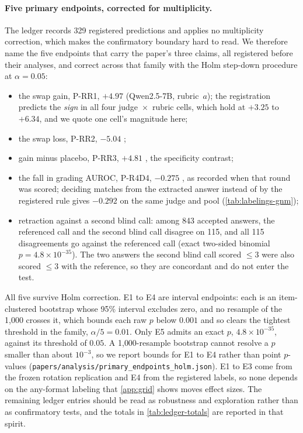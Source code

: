 \paragraph{Five primary endpoints, corrected for multiplicity.}
The ledger records 329 registered predictions and applies no multiplicity correction, which makes
the confirmatory boundary hard to read. We therefore name the five endpoints that carry the paper's
three claims, all registered before their analyses, and correct across that family with the
Holm step-down procedure at $\alpha = 0.05$:
\begin{itemize}[leftmargin=1.5em,itemsep=1pt,topsep=2pt]
\item[\textbf{E1}] the swap gain, P-RR1, $+4.97$  (Qwen2.5-7B, rubric~$a$); the
registration predicts the \emph{sign} in all four judge~$\times$~rubric cells, which hold at $+3.25$ to
$+6.34$, and we quote one cell's magnitude here;
\item[\textbf{E2}] the swap loss, P-RR2, $-5.04$ ;
\item[\textbf{E3}] gain minus placebo, P-RR3, $+4.81$ , the specificity contrast;
\item[\textbf{E4}] the fall in grading AUROC, P-R4D4, $-0.275$ , as recorded
when that round was scored; deciding matches from the extracted answer instead of by the registered
rule gives $-0.292$  on the same judge and pool (\cref{tab:labelings-gnm});
\item[\textbf{E5}] retraction against a second blind call: among 843 accepted answers, the referenced
call and the second blind call disagree on 115, and all 115 disagreements go against the referenced
call (exact two-sided binomial $p = 4.8\times10^{-35}$). The two answers the second blind call scored
$\le 3$ were also scored $\le 3$ with the reference, so they are concordant and do not enter the test.
\end{itemize}
All five survive Holm correction. E1 to E4 are interval endpoints: each is an item-clustered
bootstrap whose 95\% interval excludes zero, and no resample of the 1{,}000 crosses it, which bounds
each raw $p$ below $0.001$ and so clears the tightest threshold in the family, $\alpha/5 = 0.01$.
Only E5 admits an exact $p$, $4.8\times10^{-35}$, against its threshold of $0.05$. A 1{,}000-resample
bootstrap cannot resolve a $p$ smaller than about $10^{-3}$, so we report bounds for E1 to E4 rather
than point $p$-values (\texttt{papers/analysis/primary\_endpoints\_holm.json}). E1 to E3 come from the frozen rotation
replication and E4 from the registered labels, so none depends on the any-format labeling that
\cref{app:grid} shows moves effect sizes. The remaining ledger entries should be read as robustness
and exploration rather than as confirmatory tests, and the totals in \cref{tab:ledger-totals} are
reported in that spirit.


